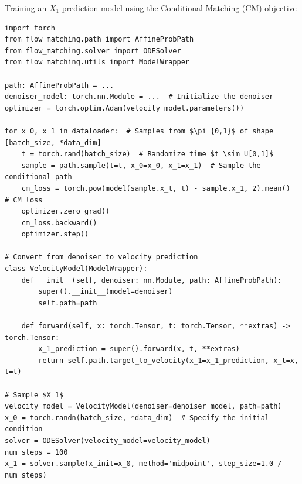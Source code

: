 \documentclass{fairmeta}
\numberwithin{equation}{section}
\begin{document}
\begin{pbox}[label={ex:fm_denoiser}]{Training an $X_1$-prediction model using the Conditional Matching (CM) objective}
\begin{verbatim}
import torch
from flow_matching.path import AffineProbPath
from flow_matching.solver import ODESolver
from flow_matching.utils import ModelWrapper

path: AffineProbPath = ...  
denoiser_model: torch.nn.Module = ...  # Initialize the denoiser
optimizer = torch.optim.Adam(velocity_model.parameters())

for x_0, x_1 in dataloader:  # Samples from $\pi_{0,1}$ of shape [batch_size, *data_dim]
    t = torch.rand(batch_size)  # Randomize time $t \sim U[0,1]$
    sample = path.sample(t=t, x_0=x_0, x_1=x_1)  # Sample the conditional path
    cm_loss = torch.pow(model(sample.x_t, t) - sample.x_1, 2).mean()  # CM loss 
    optimizer.zero_grad() 
    cm_loss.backward()
    optimizer.step()

# Convert from denoiser to velocity prediction
class VelocityModel(ModelWrapper):
    def __init__(self, denoiser: nn.Module, path: AffineProbPath):
        super().__init__(model=denoiser)
        self.path=path

    def forward(self, x: torch.Tensor, t: torch.Tensor, **extras) -> torch.Tensor:
        x_1_prediction = super().forward(x, t, **extras)
        return self.path.target_to_velocity(x_1=x_1_prediction, x_t=x, t=t) 

# Sample $X_1$
velocity_model = VelocityModel(denoiser=denoiser_model, path=path)
x_0 = torch.randn(batch_size, *data_dim)  # Specify the initial condition
solver = ODESolver(velocity_model=velocity_model)
num_steps = 100
x_1 = solver.sample(x_init=x_0, method='midpoint', step_size=1.0 / num_steps)
\end{verbatim}
\end{pbox}
\end{document}
